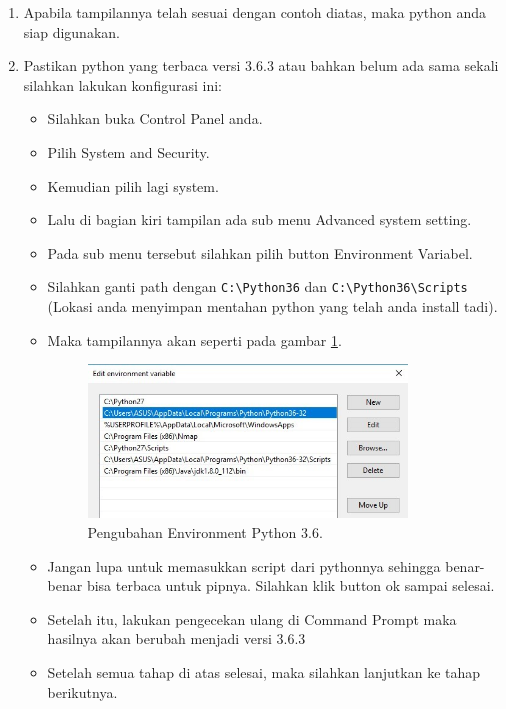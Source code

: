 \begin{enumerate}
\item Apabila tampilannya telah sesuai dengan contoh diatas, maka python anda siap digunakan.
\item Pastikan python yang terbaca versi 3.6.3 atau bahkan belum ada sama sekali silahkan lakukan konfigurasi ini:
\begin{itemize}
\item Silahkan buka Control Panel anda.
\item Pilih System and Security.
\item Kemudian pilih lagi system.
\item Lalu  di  bagian  kiri  tampilan  ada  sub menu  Advanced  system setting.
\item Pada  sub  menu  tersebut  silahkan  pilih  button  Environment Variabel.
\item Silahkan ganti path dengan \verb|C:\Python36| dan \verb|C:\Python36\Scripts| (Lokasi anda menyimpan mentahan python yang telah anda install tadi).
\item Maka tampilannya akan seperti pada gambar \ref{fig:editenv36}.
\begin{figure}[!htbp]
	\centerline{\includegraphics[width=0.85\textwidth]{figures/8/editenv36.jpg}}
	\caption{Pengubahan Environment Python 3.6.}
	\label{fig:editenv36}
\end{figure}

\item Jangan lupa untuk memasukkan script dari pythonnya sehingga benar-benar bisa terbaca untuk pipnya. Silahkan klik button ok sampai selesai.
\item Setelah itu, lakukan pengecekan ulang di Command Prompt maka hasilnya akan berubah menjadi versi 3.6.3
\item Setelah semua tahap di atas selesai, maka silahkan lanjutkan ke tahap berikutnya.
\end{itemize}
\end{enumerate}

